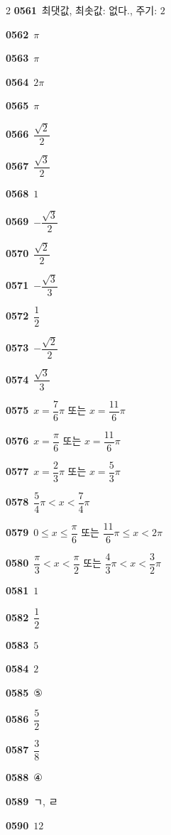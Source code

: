 \documentclass[10pt,a4paper]{article}
\begin{document}
\begin{multicols}{2}
\noindent\textbf{0561}\ 최댓값, 최솟값: 없다., 주기: $2$\par
\noindent\textbf{0562}\ $\pi$\par
\noindent\textbf{0563}\ $\pi$\par
\noindent\textbf{0564}\ $2\pi$\par
\noindent\textbf{0565}\ $\pi$\par
\noindent\textbf{0566}\ $\dfrac{\sqrt{2}}{2}$\par
\noindent\textbf{0567}\ $\dfrac{\sqrt{3}}{2}$\par
\noindent\textbf{0568}\ $1$\par
\noindent\textbf{0569}\ $-\dfrac{\sqrt{3}}{2}$\par
\noindent\textbf{0570}\ $\dfrac{\sqrt{2}}{2}$\par
\noindent\textbf{0571}\ $-\dfrac{\sqrt{3}}{3}$\par
\noindent\textbf{0572}\ $\dfrac{1}{2}$\par
\noindent\textbf{0573}\ $-\dfrac{\sqrt{2}}{2}$\par
\noindent\textbf{0574}\ $\dfrac{\sqrt{3}}{3}$\par
\noindent\textbf{0575}\ $x=\dfrac{7}{6}\pi$ 또는 $x=\dfrac{11}{6}\pi$\par
\noindent\textbf{0576}\ $x=\dfrac{\pi}{6}$ 또는 $x=\dfrac{11}{6}\pi$\par
\noindent\textbf{0577}\ $x=\dfrac{2}{3}\pi$ 또는 $x=\dfrac{5}{3}\pi$\par
\noindent\textbf{0578}\ $\dfrac{5}{4}\pi<x<\dfrac{7}{4}\pi$\par
\noindent\textbf{0579}\ $0\le x\le\dfrac{\pi}{6}$ 또는 $\dfrac{11}{6}\pi\le x<2\pi$\par
\noindent\textbf{0580}\ $\dfrac{\pi}{3}<x<\dfrac{\pi}{2}$ 또는 $\dfrac{4}{3}\pi<x<\dfrac{3}{2}\pi$\par
\noindent\textbf{0581}\ $1$\par
\noindent\textbf{0582}\ $\dfrac{1}{2}$\par
\noindent\textbf{0583}\ $5$\par
\noindent\textbf{0584}\ $2$\par
\noindent\textbf{0585}\ ⑤\par
\noindent\textbf{0586}\ $\dfrac{5}{2}$\par
\noindent\textbf{0587}\ $\dfrac{3}{8}$\par
\noindent\textbf{0588}\ ④\par
\noindent\textbf{0589}\ ㄱ, ㄹ\par
\noindent\textbf{0590}\ $12$\par

\end{multicols}
\end{document}
